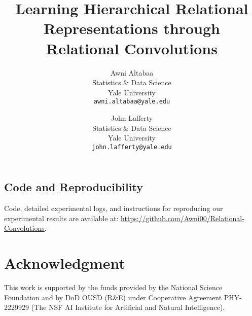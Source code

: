 \documentclass[pdftex]{article}
\title{Learning Hierarchical Relational Representations through \\ Relational Convolutions}
\author{
    Awni Altabaa\\
    Statistics \& Data Science\\
    Yale University\\
    \texttt{awni.altabaa@yale.edu}
    \and
    John Lafferty\\
    Statistics \& Data Science\\
    Yale University\\
    \texttt{john.lafferty@yale.edu}
    }
\date{}
\begin{document}
\maketitle









% 






\subsection*{Code and Reproducibility}
Code, detailed experimental logs, and instructions for reproducing our experimental results are available at: \url{https://github.com/Awni00/Relational-Convolutions}.

\section*{Acknowledgment}
This work is supported by the funds provided by the National Science Foundation and by DoD OUSD (R\&E) under Cooperative Agreement PHY-2229929 (The NSF AI Institute for Artificial and Natural Intelligence).



% 
% 

\clearpage
\newpage
\appendix


\clearpage\newpage

\clearpage\newpage

\clearpage\newpage

\end{document}
